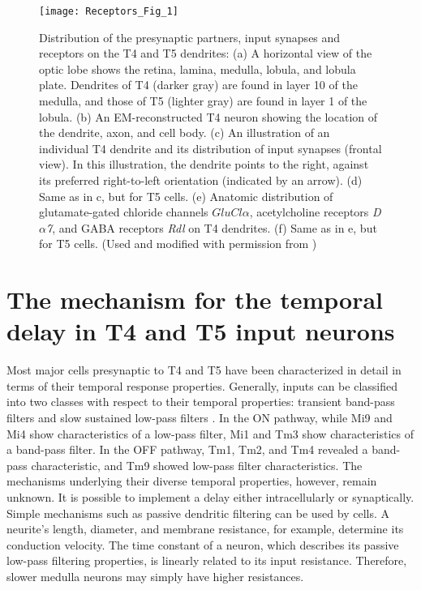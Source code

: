 \begin{figure}
\centering
\hspace*{-1cm} 
\texttt{[image: Receptors\_Fig\_1]}
\caption[Distribution of the presynaptic partners, input synapses and receptors on the T4 and T5 dendrites] {Distribution of the presynaptic partners, input synapses and receptors on the T4 and T5 dendrites: (a) A horizontal view of the optic lobe shows the retina, lamina, medulla, lobula, and lobula plate. Dendrites of T4 (darker gray) are found in layer 10 of the medulla, and those of T5 (lighter gray) are found in layer 1 of the lobula. (b) An EM-reconstructed T4 neuron showing the location of the dendrite, axon, and cell body. (c) An illustration of an individual T4 dendrite and its distribution of input synapses (frontal view). In this illustration, the dendrite points to the right, against its preferred right-to-left orientation (indicated by an arrow). (d) Same as in c, but for T5 cells. (e) Anatomic distribution of glutamate-gated chloride channels \textit{$GluCl\alpha$}, acetylcholine receptors \textit{D$\alpha$7}, and GABA receptors \textit{Rdl} on T4 dendrites. (f) Same as in e, but for T5 cells. (Used and modified with permission from \parencite{Fendl2020})} 
\label{fig:receptors}
\end{figure}

\section{The mechanism for the temporal delay in T4 and T5 input neurons}
Most major cells presynaptic to T4 and T5 have been characterized in detail in terms of their temporal response properties. Generally, inputs can be classified into two classes with respect to their temporal properties: transient band-pass filters and slow sustained low-pass filters \parencite{Arenz2017, Serbe2016}. In the ON pathway, while Mi9 and Mi4 show characteristics of a low-pass filter, Mi1 and Tm3 show characteristics of a band-pass filter. In the OFF pathway, Tm1, Tm2, and Tm4 revealed a band-pass characteristic, and Tm9 showed low-pass filter characteristics. The mechanisms underlying their diverse temporal properties, however, remain unknown. It is possible to implement a delay either intracellularly or synaptically. Simple mechanisms such as passive dendritic filtering can be used by cells. A neurite's length, diameter, and membrane resistance, for example, determine its conduction velocity. The time constant of a neuron, which describes its passive low-pass filtering properties, is linearly related to its input resistance. Therefore, slower medulla neurons may simply have higher resistances.

